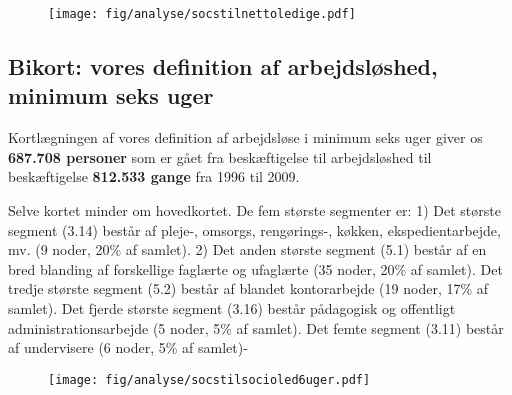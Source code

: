 \begin{figure}[H]
\begin{centering}
	\texttt{[image: fig/analyse/socstilnettoledige.pdf]}
	\label{fig_hist_beskaeftigede_allekategorier132}
\end{centering}
\end{figure}


\newpage \subsection{Bikort: vores definition af arbejdsløshed, minimum seks uger \label{}}

Kortlægningen af vores definition af arbejdsløse i minimum seks uger giver os \textbf{687.708 personer} som er gået fra beskæftigelse til arbejdsløshed til beskæftigelse \textbf{812.533 gange} fra 1996 til 2009.

Selve kortet minder om hovedkortet. De fem største segmenter er: 1) Det største segment (3.14) består af pleje-, omsorgs, rengørings-, køkken, ekspedientarbejde, mv. (9 noder, 20\% af samlet). 2) Det anden største segment (5.1) består af en bred blanding af forskellige faglærte og ufaglærte (35 noder, 20\% af samlet). Det tredje største segment (5.2) består af blandet kontorarbejde (19 noder, 17\% af samlet). Det fjerde største segment (3.16) består pådagogisk og offentligt administrationsarbejde (5 noder, 5\% af samlet). Det  femte segment (3.11) består af undervisere (6 noder, 5\% af samlet)-

\begin{figure}[H]
\begin{centering}
	\texttt{[image: fig/analyse/socstilsocioled6uger.pdf]}
	\label{fig_hist_beskaeftigede_allekategorier132}
\end{centering}
\end{figure}





